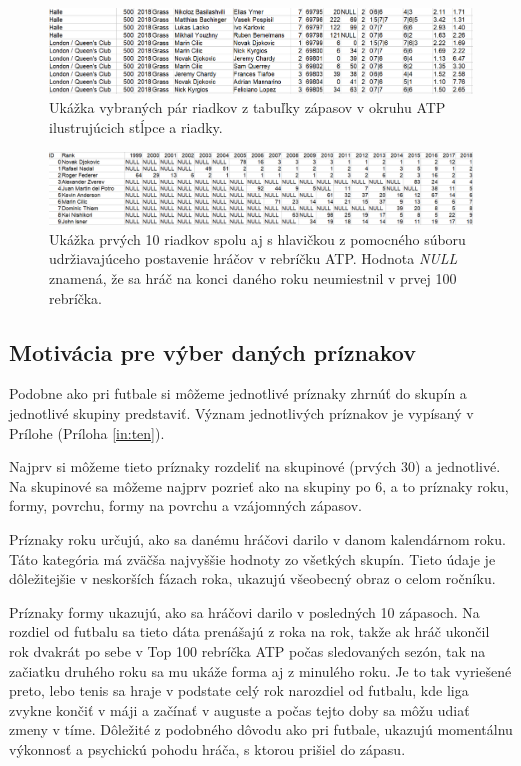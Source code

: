 \noindent
\begin{figure}[b]
\includegraphics[width=\textwidth]{../img/atp.png}
\caption{Ukážka vybraných pár riadkov z tabuľky zápasov v okruhu ATP ilustrujúcich stĺpce a riadky.}
\end{figure}

\noindent
\begin{figure}
\includegraphics[width=\textwidth]{../img/rank.png}
\caption{Ukážka prvých 10 riadkov spolu aj s hlavičkou z pomocného súboru udržiavajúceho postavenie hráčov v rebríčku ATP. Hodnota \textit{NULL} znamená, že sa hráč na konci daného roku neumiestnil v prvej 100 rebríčka.}
\label{rank}
\end{figure}

\subsection{Motivácia pre výber daných príznakov}
Podobne ako pri futbale si môžeme jednotlivé príznaky zhrnúť do skupín a jednotlivé skupiny predstaviť. Význam jednotlivých príznakov je vypísaný v Prílohe (Príloha \ref{in:ten}).

Najprv si môžeme tieto príznaky rozdeliť na skupinové (prvých 30) a jednotlivé.
Na skupinové sa môžeme najprv pozrieť ako na skupiny po 6, a to príznaky roku, formy, povrchu, formy na povrchu a vzájomných zápasov.

Príznaky roku určujú, ako sa danému hráčovi darilo v danom kalendárnom roku.
Táto kategória má zväčša najvyššie hodnoty zo všetkých skupín. Tieto údaje je dôležitejšie v neskorších fázach roka, ukazujú všeobecný obraz o celom ročníku.

Príznaky formy ukazujú, ako sa hráčovi darilo v posledných 10 zápasoch. Na rozdiel od futbalu sa tieto dáta prenášajú z roka na rok, takže ak hráč ukončil rok dvakrát po sebe v Top 100 rebríčka ATP počas sledovaných sezón, tak na začiatku druhého roku sa mu ukáže forma aj z minulého roku. Je to tak vyriešené preto, lebo tenis sa hraje v podstate celý rok narozdiel od futbalu, kde liga zvykne končiť v máji a začínať v auguste a počas tejto doby sa môžu udiať zmeny v tíme.
Dôležité z podobného dôvodu ako pri futbale, ukazujú momentálnu výkonnosť a psychickú pohodu hráča, s ktorou prišiel do zápasu.

